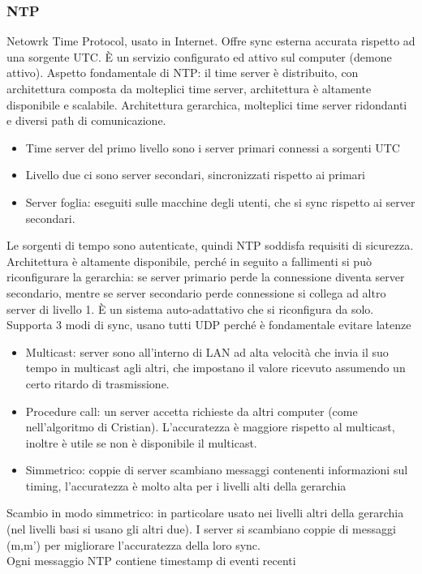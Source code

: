\documentclass[16px]{article}
\begin{document}
\subsubsection{NTP}
Netowrk Time Protocol, usato in Internet. Offre sync esterna accurata rispetto ad una sorgente UTC. È un servizio configurato ed attivo sul computer (demone attivo). Aspetto fondamentale di NTP: il time server è distribuito, con architettura composta da molteplici time server, architettura è altamente disponibile e scalabile. Architettura gerarchica, molteplici time server ridondanti e diversi path di comunicazione.
\begin{itemize}
\item Time server del primo livello sono i server primari connessi a sorgenti UTC
\item Livello due ci sono server secondari, sincronizzati rispetto ai primari
\item Server foglia: eseguiti sulle macchine degli utenti, che si sync rispetto ai server secondari.
\end{itemize}
Le sorgenti di tempo sono autenticate, quindi NTP soddisfa requisiti di sicurezza. Architettura è altamente disponibile, perché in seguito a fallimenti si può riconfigurare la gerarchia: se server primario perde la connessione diventa server secondario, mentre se server secondario perde connessione si collega ad altro server di livello 1. È un sistema auto-adattativo che si riconfigura da solo.\\ Supporta 3 modi di sync, usano tutti UDP perché è fondamentale evitare latenze
\begin{itemize}
\item Multicast: server sono all'interno di LAN ad alta velocità che invia il suo tempo in multicast agli altri, che impostano il valore ricevuto assumendo un certo ritardo di trasmissione.
\item Procedure call: un server accetta richieste da altri computer (come nell'algoritmo di Cristian). L'accuratezza è maggiore rispetto al multicast, inoltre   è utile se non è disponibile il multicast.
\item Simmetrico: coppie di server scambiano messaggi contenenti informazioni sul timing, l'accuratezza è molto alta per i livelli alti della gerarchia
\end{itemize}
Scambio in modo simmetrico: in particolare usato nei livelli altri della gerarchia (nel livelli basi si usano gli altri due). I server si scambiano coppie di messaggi (m,m') per migliorare l'accuratezza della loro sync.\\ Ogni messaggio NTP contiene timestamp di eventi recenti
\end{document}
